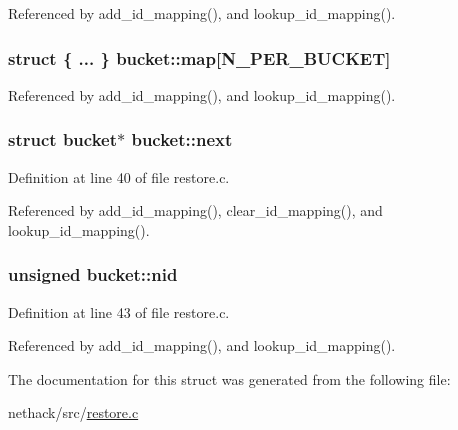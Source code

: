 Referenced by add\+\_\+id\+\_\+mapping(), and lookup\+\_\+id\+\_\+mapping().

\hypertarget{structbucket_a7cd78d1e66df897b15f34f0fd2169b5e}{
\subsubsection[{map}]{\setlength{\rightskip}{0pt plus 5cm}struct \{ ... \}   bucket\+::map\mbox{[}{\bf N\+\_\+\+P\+E\+R\+\_\+\+B\+U\+C\+K\+E\+T}\mbox{]}}}\label{structbucket_a7cd78d1e66df897b15f34f0fd2169b5e}


Referenced by add\+\_\+id\+\_\+mapping(), and lookup\+\_\+id\+\_\+mapping().

\hypertarget{structbucket_a70c4dfb30de550c0caf1ce95f5e8803f}{
\subsubsection[{next}]{\setlength{\rightskip}{0pt plus 5cm}struct {\bf bucket}$\ast$ bucket\+::next}}\label{structbucket_a70c4dfb30de550c0caf1ce95f5e8803f}


Definition at line 40 of file restore.\+c.



Referenced by add\+\_\+id\+\_\+mapping(), clear\+\_\+id\+\_\+mapping(), and lookup\+\_\+id\+\_\+mapping().

\hypertarget{structbucket_a4e1895c200b88f0355e2164c58ac49cb}{
\subsubsection[{nid}]{\setlength{\rightskip}{0pt plus 5cm}unsigned bucket\+::nid}}\label{structbucket_a4e1895c200b88f0355e2164c58ac49cb}


Definition at line 43 of file restore.\+c.



Referenced by add\+\_\+id\+\_\+mapping(), and lookup\+\_\+id\+\_\+mapping().



The documentation for this struct was generated from the following file\+:\begin{DoxyCompactItemize}
\item 
nethack/src/\hyperlink{restore_8c}{restore.\+c}\end{DoxyCompactItemize}
